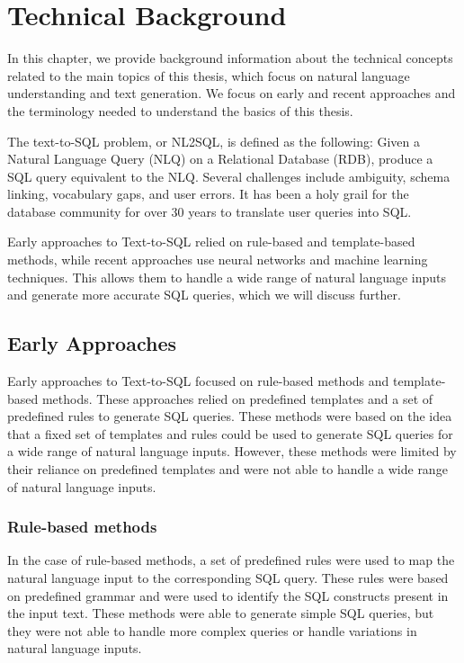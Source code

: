 \section{Technical Background}

In this chapter, we provide background information about the technical concepts related to the main topics of this thesis, which focus on natural language understanding and text generation. We focus on early and recent approaches and the terminology needed to understand the basics of this thesis.

The text-to-SQL problem, or NL2SQL, is defined as the following: Given a Natural Language Query (NLQ) on a Relational Database (RDB), produce a SQL query equivalent to the NLQ. Several challenges include ambiguity, schema linking, vocabulary gaps, and user errors. It has been a holy grail for the database community for over 30 years to translate user queries into SQL.

Early approaches to Text-to-SQL relied on rule-based and template-based methods, while recent approaches use neural networks and machine learning techniques. This allows them to handle a wide range of natural language inputs and generate more accurate SQL queries, which we will discuss further.

\subsection{Early Approaches}

Early approaches to Text-to-SQL focused on rule-based methods and template-based methods. These approaches relied on predefined templates and a set of predefined rules to generate SQL queries. These methods were based on the idea that a fixed set of templates and rules could be used to generate SQL queries for a wide range of natural language inputs. However, these methods were limited by their reliance on predefined templates and were not able to handle a wide range of natural language inputs.

\subsubsection{Rule-based methods}

In the case of rule-based methods, a set of predefined rules were used to map the natural language input to the corresponding SQL query. These rules were based on predefined grammar and were used to identify the SQL constructs present in the input text. These methods were able to generate simple SQL queries, but they were not able to handle more complex queries or handle variations in natural language inputs.

